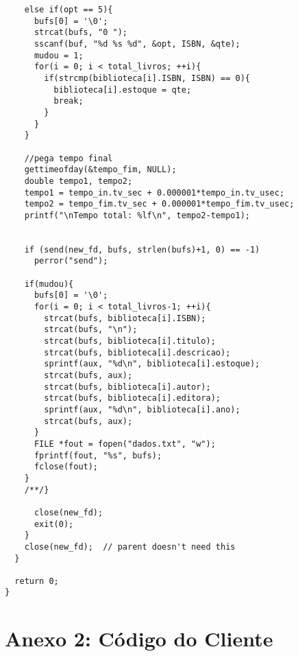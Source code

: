 \documentclass[11pt, brazil]{article} %
\begin{document}
\begin{verbatim}
	else if(opt == 5){
	  bufs[0] = '\0';
	  strcat(bufs, "0 ");
	  sscanf(buf, "%d %s %d", &opt, ISBN, &qte);
	  mudou = 1;
	  for(i = 0; i < total_livros; ++i){
	    if(strcmp(biblioteca[i].ISBN, ISBN) == 0){
	      biblioteca[i].estoque = qte;
	      break;
	    }		    				
	  }
	}
	
	//pega tempo final
	gettimeofday(&tempo_fim, NULL);
	double tempo1, tempo2;
	tempo1 = tempo_in.tv_sec + 0.000001*tempo_in.tv_usec;
	tempo2 = tempo_fim.tv_sec + 0.000001*tempo_fim.tv_usec;
	printf("\nTempo total: %lf\n", tempo2-tempo1);
				
				
	if (send(new_fd, bufs, strlen(bufs)+1, 0) == -1)
	  perror("send");
				
	if(mudou){
	  bufs[0] = '\0';
	  for(i = 0; i < total_livros-1; ++i){
	    strcat(bufs, biblioteca[i].ISBN);
	    strcat(bufs, "\n");
	    strcat(bufs, biblioteca[i].titulo);
	    strcat(bufs, biblioteca[i].descricao);
	    sprintf(aux, "%d\n", biblioteca[i].estoque);
	    strcat(bufs, aux);
	    strcat(bufs, biblioteca[i].autor);
	    strcat(bufs, biblioteca[i].editora);
	    sprintf(aux, "%d\n", biblioteca[i].ano);
	    strcat(bufs, aux);			
	  }
	  FILE *fout = fopen("dados.txt", "w");
	  fprintf(fout, "%s", bufs);
	  fclose(fout);
	}
	/**/}
						
      close(new_fd);
      exit(0);
    }
    close(new_fd);  // parent doesn't need this
  }

  return 0;
}
\end{verbatim}


\section*{Anexo 2: Código do Cliente}
\end{document}
